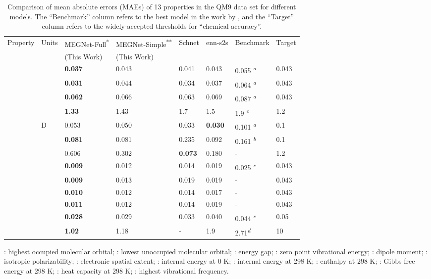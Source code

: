 \documentclass[manuscript=article]{achemso}
\begin{document}
\begin{table}
  \caption{\label{tbl:qm9} Comparison of mean absolute errors (MAEs) of 13 properties in the QM9 data set for different models. The ``Benchmark'' column refers to the best model in the work by \citet{Faber2017}, and the ``Target'' column refers to the widely-accepted thresholds for ``chemical accuracy''.\cite{Faber2017}}
  \footnotesize
  \begin{tabular}{llllllll}
    \hline
    Property  & Units & MEGNet-Full\textsuperscript{*} & MEGNet-Simple\textsuperscript{**} &Schnet\cite{Schutt2018}  & enn-s2s\cite{gilmer2017neural} & Benchmark \cite{Faber2017} & Target\\
    & & (This Work) & (This Work) & & & & \\
    \hline
     &  & \textbf{0.037} & 0.043 &0.041  & 0.043 & 0.055 \textsuperscript{\emph{a}} & 0.043\\
    &  & \textbf{0.031}& 0.044&0.034 & 0.037 & 0.064 \textsuperscript{\emph{a}} & 0.043 \\
    &  & \textbf{0.062} & 0.066&0.063 & 0.069 & 0.087 \textsuperscript{\emph{a}} & 0.043 \\
     & & \textbf{1.33} & 1.43&1.7& 1.5 & 1.9 \textsuperscript{\emph{c}} & 1.2\\
     &D  & 0.053& 0.050&0.033& \textbf{0.030} & 0.101 \textsuperscript{\emph{a}} & 0.1\\
     &  & \textbf{0.081} & 0.081& 0.235 & 0.092 & 0.161 \textsuperscript{\emph{b}} & 0.1\\
     &  & 0.606& 0.302& \textbf{0.073} & 0.180 & - & 1.2\\
     &  & \textbf{0.009} & 0.012& 0.014 & 0.019 & 0.025 \textsuperscript{\emph{c}} & 0.043\\
     &  &\textbf{0.009} & 0.013&0.019 & 0.019 & - & 0.043\\ 
     &  & \textbf{0.010} & 0.012&0.014 & 0.017 & - & 0.043\\
     &  & \textbf{0.011} & 0.012&0.014 & 0.019 & - & 0.043\\
     &  & \textbf{0.028} & 0.029& 0.033 & 0.040 & 0.044 \textsuperscript{\emph{c}} & 0.05\\
     &  & \textbf{1.02} & 1.18&- & 1.9 & 2.71\textsuperscript{\emph{d}} & 10 \\
    \hline
  \end{tabular}
  \begin{flushleft}
  : highest occupied molecular orbital; : lowest unoccupied molecular orbital; : energy gap; : zero point vibrational energy; : dipole moment; : isotropic polarizability; : electronic spatial extent; : internal energy at 0 K; : internal energy at 298 K; : enthalpy at 298 K; : Gibbs free energy at 298 K; : heat capacity at 298 K; : highest vibrational frequency.\\ 

\end{flushleft}
\end{table}
\end{document}

